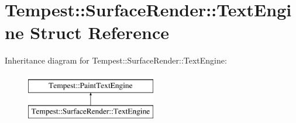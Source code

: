 \hypertarget{struct_tempest_1_1_surface_render_1_1_text_engine}{\section{Tempest\+:\+:Surface\+Render\+:\+:Text\+Engine Struct Reference}
\label{struct_tempest_1_1_surface_render_1_1_text_engine}
}
Inheritance diagram for Tempest\+:\+:Surface\+Render\+:\+:Text\+Engine\+:\begin{figure}[H]
\begin{center}
\leavevmode
\includegraphics[height=2.000000cm]{struct_tempest_1_1_surface_render_1_1_text_engine}
\end{center}
\end{figure}
